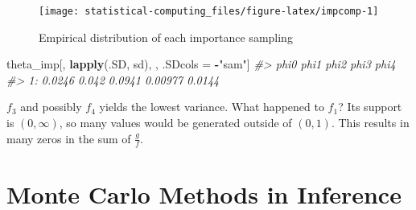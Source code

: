 \documentclass[]{book}
\newenvironment{Shaded}{\begin{snugshade}}{\end{snugshade}}
\newcommand{\CommentTok}[1]{\textcolor[rgb]{0.56,0.35,0.01}{\textit{#1}}}
\newcommand{\DataTypeTok}[1]{\textcolor[rgb]{0.13,0.29,0.53}{#1}}
\newcommand{\DecValTok}[1]{\textcolor[rgb]{0.00,0.00,0.81}{#1}}
\newcommand{\FloatTok}[1]{\textcolor[rgb]{0.00,0.00,0.81}{#1}}
\newcommand{\KeywordTok}[1]{\textcolor[rgb]{0.13,0.29,0.53}{\textbf{#1}}}
\newcommand{\NormalTok}[1]{#1}
\newcommand{\OperatorTok}[1]{\textcolor[rgb]{0.81,0.36,0.00}{\textbf{#1}}}
\newcommand{\StringTok}[1]{\textcolor[rgb]{0.31,0.60,0.02}{#1}}
\theoremstyle{definition}
\theoremstyle{definition}
\theoremstyle{definition}
\theoremstyle{remark}
\begin{document}
\begin{Shaded}
\end{Shaded}

\begin{figure}[H]

{\centering \texttt{[image: statistical-computing\_files/figure-latex/impcomp-1]} 

}

\caption{Empirical distribution of each importance sampling}\label{fig:impcomp}
\end{figure}

\begin{Shaded}
\begin{Highlighting}[]
\NormalTok{theta_imp[,}
          \KeywordTok{lapply}\NormalTok{(.SD, sd),}
\NormalTok{          , .SDcols =}\StringTok{ }\OperatorTok{-}\StringTok{"sam"}\NormalTok{]}
\CommentTok{#>      phi0  phi1   phi2    phi3   phi4}
\CommentTok{#> 1: 0.0246 0.042 0.0941 0.00977 0.0144}
\end{Highlighting}
\end{Shaded}

\(f_3\) and possibly \(f_4\) yields the lowest variance. What happened to \(f_1\)? Its support is \((0, \infty)\), so many values would be generated outside of \((0,1)\). This results in many zeros in the sum of \(\frac{g}{f}\).

\hypertarget{monte-carlo-methods-in-inference}{%
\chapter{Monte Carlo Methods in Inference}\label{monte-carlo-methods-in-inference}}
\end{document}
